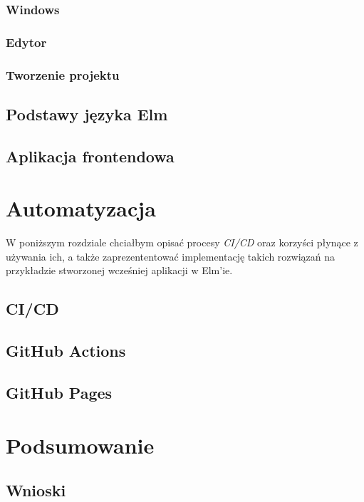 \documentclass[twoside,a4paper]{report}
\begin{document}
\subsection{Windows}

\subsection{Edytor}

\subsection{Tworzenie projektu}

\section{Podstawy języka Elm}

\section{Aplikacja frontendowa}


\chapter{Automatyzacja}
W poniższym rozdziale chciałbym opisać procesy \textit{CI/CD} oraz korzyści płynące z używania ich, a także zaprezententować implementację takich rozwiązań na przykładzie stworzonej wcześniej aplikacji w Elm'ie.

\section{CI/CD}

\section{GitHub Actions}

\section{GitHub Pages}


\chapter{Podsumowanie}

\section{Wnioski}


\listoffigures
\lstlistoflistings{}

\printbibliography{}

\end{document}
